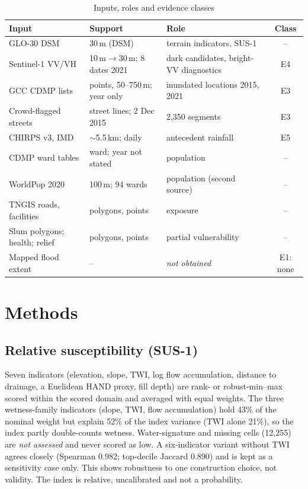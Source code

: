 \documentclass[conference]{IEEEtran}
\begin{document}
\begin{table}[t]
\caption{Inputs, roles and evidence classes}
\label{tab:data}
\centering\footnotesize
\begin{tabular}{@{}p{2.25cm}p{1.75cm}p{2.55cm}c@{}}
\toprule
Input & Support & Role & Class \\
\midrule
GLO-30 DSM & 30\,m (DSM) & terrain indicators, SUS-1 & -- \\
Sentinel-1 VV/VH & 10\,m$\to$30\,m; 8 dates 2021 & dark candidates, bright-VV diagnostics & E4 \\
GCC CDMP lists \cite{gcc2026cdmp} & points, 50--750\,m; year only & inundated locations 2015, 2021 & E3 \\
Crowd-flagged streets & street lines; 2 Dec 2015 & 2,350 segments & E3 \\
CHIRPS v3, IMD & ${\sim}$5.5\,km; daily & antecedent rainfall & E5 \\
CDMP ward tables & ward; year not stated & population & -- \\
WorldPop 2020 \cite{tatem2017worldpop} & 100\,m; 94 wards & population (second source) & -- \\
TNGIS roads, facilities & polygons, points & exposure & -- \\
Slum polygons; health; relief & polygons, points & partial vulnerability & -- \\
\midrule
Mapped flood extent & -- & \emph{not obtained} & E1: none \\
\bottomrule
\end{tabular}
\end{table}

\section{Methods}
\subsection{Relative susceptibility (SUS-1)}
Seven indicators (elevation, slope, TWI, log flow accumulation, distance to drainage, a Euclidean HAND proxy, fill depth) are rank- or robust-min--max scored within the scored domain and averaged with equal weights. The three wetness-family indicators (slope, TWI, flow accumulation) hold 43\% of the nominal weight but explain 52\% of the index variance (TWI alone 21\%), so the index partly double-counts wetness. Water-signature and missing cells (12{,}255) are \emph{not assessed} and never scored as low. A six-indicator variant without TWI agrees closely (Spearman 0.982; top-decile Jaccard 0.890) and is kept as a sensitivity case only. This shows robustness to one construction choice, not validity. The index is relative, uncalibrated and not a probability.
\end{document}
